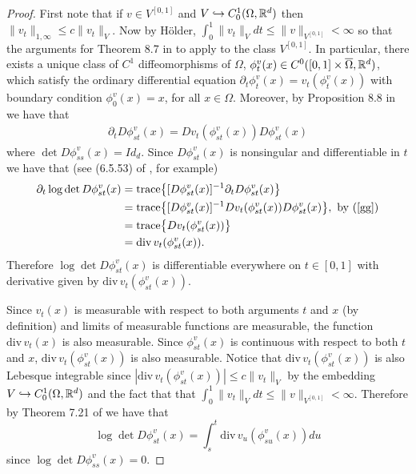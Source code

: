 \documentclass[noinfoline]{imsart}
\begin{document}
\begin{proof}
First note that if $v\in V^{[0,1]}$ and $V\hookrightarrow C_0^1(\Omega, \Bbb R^d)$ then $ \| v_t \|_{1,\infty} \leq c \| v_t \|_{V} $. Now by H\"older, $\int_0^1 \| v_t \|_{V} dt \leq \|v \|_{V^{[0,1]}}<\infty$  so that the arguments for  Theorem 8.7   in \cite{you:10} to apply to the class  $ V^{[0,1]}$. In particular, there exists a unique  class of $C^1$ diffeomorphisms of $\Omega$, $\phi_t^v(x)\in C^0 ([0,1]\times \overline \Omega,\Bbb R^d)$, which satisfy the ordinary differential equation $\partial_t \phi_t^v(x) = v_t(\phi_t^v(x))$
 with boundary condition $\phi_0^v(x)=x$, for all $x\in \Omega$. Moreover, by Proposition 8.8 in \cite{you:10} we have that
 \begin{align}
    \partial_t D\phi_{st}^v(x)  =  D v_t (\phi_{st}^v(x))  D\phi_{st}^v(x) \label{gg}
\end{align}
where $\det D\phi_{ss}^v(x)=Id_d$.
Since $D\phi_{st}^v(x)$ is nonsingular and differentiable in $t$ we have that (see  (6.5.53) of \cite{hor:91}, for example)
\begin{align*}
\partial_t \log \det D\phi_{st}^v(x)&= \text{trace}\bigl\{ [D\phi_{st}^v(x)]^{-1}   \partial_t D\phi_{st}^v(x)  \bigr\} \\
& = \text{trace}\bigl\{ [D\phi_{st}^v(x)]^{-1}  D v_t (\phi_{st}^v(x))  D\phi_{st}^v(x) \bigr\} ,\,\,\text{by (\ref{gg})} \\
& = \text{trace}\bigl\{ D v_t (\phi_{st}^v(x))  \bigr\} \\
& = \text{div}\, v_t (\phi_{st}^v(x)).
\end{align*}
Therefore $\log \det D\phi_{st}^v(x)$ is differentiable everywhere on $t\in [0,1]$ with derivative given by $ \text{div}\, v_t (\phi_{st}^v(x))$.

Since $v_t(x)$ is measurable with respect to both arguments $t$ and $x$ (by definition) and limits of measurable functions are measurable, the function $\text{div}\,v_t(x)$  is also measurable. Since $\phi^v_{st}(x)$ is continuous with respect to both $t$ and $x$,  $\text{div}\, v_t (\phi_{st}^v(x))$ is also measurable.
Notice that $\text{div}\, v_t (\phi_{st}^v(x))$  is also Lebesque integrable since $|\text{div}\, v_t (\phi_{st}^v(x))| \leq c\| v_t \|_V$ by the embedding $V\hookrightarrow C_0^1(\Omega,\Bbb R^d)$ and the fact that that  $\int_0^1 \| v_t \|_{V} dt \leq \|v \|_{V^{[0,1]}}<\infty$.
Therefore by Theorem 7.21 of \cite{rud:66} we have that
\[\log \det D\phi_{st}^v(x) =  \int_s^t  \text{div}\, v_u (\phi_{su}^v(x))  du\]
since $\log \det D\phi_{ss}^v(x) = 0$. \end{proof}
\end{document}
